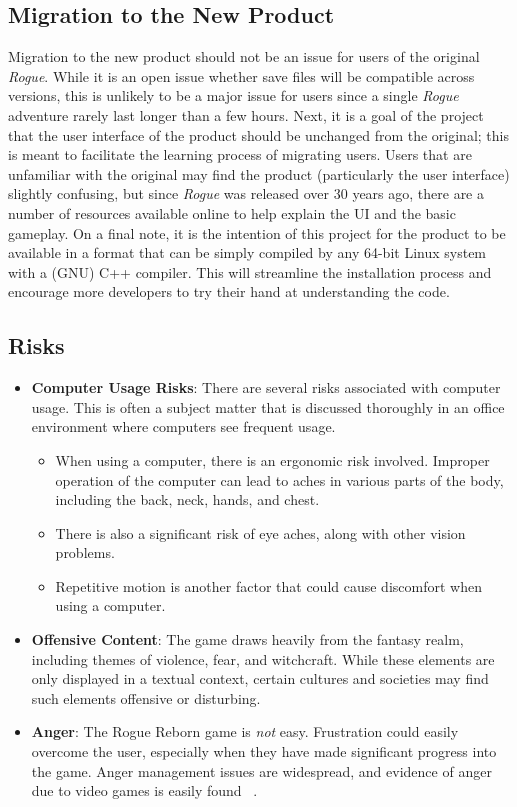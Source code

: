 \documentclass[12pt, titlepage]{article}
\begin{document}
	\subsection{Migration to the New Product}

	Migration to the new product should not be an issue for users of the original \textit{Rogue}.  While it is an open issue whether save files will be compatible across versions, this is unlikely to be a major issue for users since a single \textit{Rogue} adventure rarely last longer than a few hours. Next, it is a goal of the project that the user interface of the product should be unchanged from the original; this is meant to facilitate the learning process of migrating users.  Users that are unfamiliar with the original may find the product (particularly the user interface) slightly confusing, but since \textit{Rogue} was released over 30 years ago, there are a number of resources available online to help explain the UI and the basic gameplay.  On a final note, it is the intention of this project for the product to be available in a format that can be simply compiled by any 64-bit Linux system with a (GNU) C++ compiler.  This will streamline the installation process and encourage more developers to try their hand at understanding the code.

	\subsection{Risks}

	\begin{itemize}
		\item \textbf{Computer Usage Risks}: There are several risks associated with computer usage. This is often a subject matter that is discussed thoroughly in an office environment where computers see frequent usage.
		\begin{itemize}
			\item When using a computer, there is an ergonomic risk involved. Improper operation of the computer can lead to aches in various parts of the body, including the back, neck, hands, and chest.
			\item There is also a significant risk of eye aches, along with other vision problems.
			\item Repetitive motion is another factor that could cause discomfort when using a computer.
		\end{itemize}
		\item \textbf{Offensive Content}: The game draws heavily from the fantasy realm, including themes of violence, fear, and witchcraft.  While these elements are only displayed in a textual context, certain cultures and societies may find such elements offensive or disturbing.
		\item \textbf{Anger}: The Rogue Reborn game is \textit{not} easy. Frustration could easily overcome the user, especially when they have made significant progress into the game.  Anger management issues are widespread, and evidence of anger due to video games is easily found ~\citep{GameAnger}.
	\end{itemize}
\end{document}
